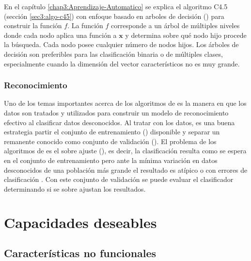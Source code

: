 En el capítulo \ref{chap3:Aprendizaje-Automatico} se explica el algoritmo
C4.5 (sección \ref{sec3:algo-c45}) con enfoque basado en arboles
de decisión () para construir la función $f$. La función
$f$ corresponde a un árbol de múltiples niveles donde cada nodo aplica
una función a $\boldsymbol{x}$ y determina sobre qué nodo hijo procede
la búsqueda. Cada nodo posee cualquier número de nodos hijos. Los
árboles de decisión son preferibles para las clasificación binaria
o de múltiples clases, especialmente cuando la dimensión del vector
característicos no es muy grande\cite{Rajaraman2011}.

\subsubsection{Reconocimiento}

Uno de los temas importantes acerca de los algoritmos de 
es la manera en que los datos son tratados y utilizados para construir
un modelo de reconocimiento efectivo al clasificar datos desconocidos.
Al tratar con los datos, es una buena estrategia partir el conjunto
de entrenamiento () disponible y separar un remanente
conocido como conjunto de validación (). El problema
de los algoritmos de  es el sobre ajuste (),
es decir, la clasificación resulta como se espera en el conjunto de
entrenamiento pero ante la mínima variación en datos desconocidos
de una población más grande el resultado es atípico o con errores
de clasificación \cite{Rajaraman2011}. Con este conjunto de validación
se puede evaluar el clasificador determinando si se sobre ajustan
los resultados.

\section{Capacidades deseables}

\subsection{Características no funcionales}

